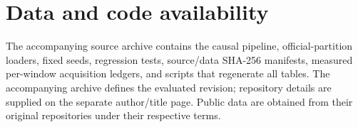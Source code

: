 \documentclass[12pt]{article}
\begin{document}
\section*{Data and code availability}
The accompanying source archive contains the causal pipeline, official-partition
loaders, fixed seeds, regression tests, source/data SHA-256 manifests, measured
per-window acquisition ledgers, and scripts that regenerate all tables.
The accompanying archive defines the evaluated revision; repository details
are supplied on the separate author/title page. Public data are obtained
from their original repositories under their respective terms.

\clearpage


\end{document}
